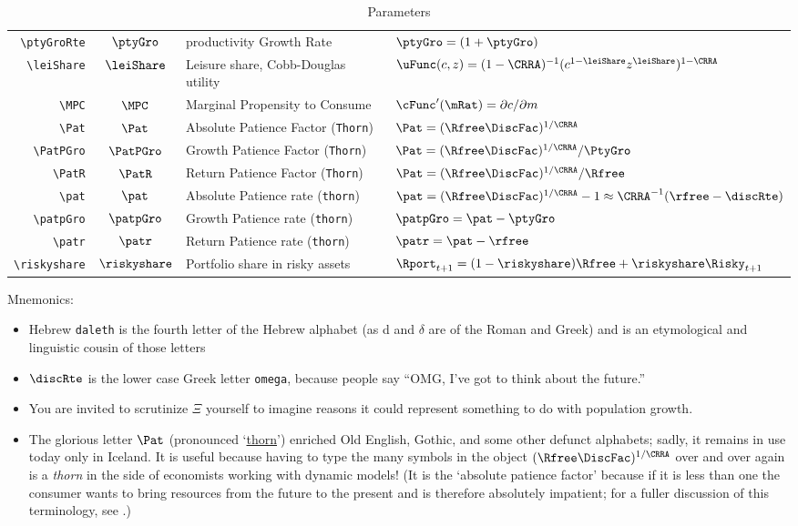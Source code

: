 \documentclass[12pt]{\econtex}
\begin{document}
\begin{table}[ht]
\begin{tabular}{|>{\ttfamily}rcll|}
    \\ \verb|\ptyGroRte|  & $\ptyGro$ & productivity Growth Rate & $\ptyGro = (1+\ptyGro)$
    \\ \verb|\leiShare|  & $\leiShare$ & Leisure share, Cobb-Douglas utility & $\uFunc(c,z)=(1-\CRRA)^{-1}(c^{1-\leiShare}z^{\leiShare})^{1-\CRRA}$
    \\ \verb|\MPC|  & $\MPC$ & Marginal Propensity to Consume & $\cFunc^{\prime}(\mRat)=\partial c/\partial m$
    \\ \verb|\Pat|  & $\Pat$ & Absolute Patience Factor (\texttt{Thorn}) & $\Pat = (\Rfree \DiscFac)^{1/\CRRA} $
    \\ \verb|\PatPGro| & $\PatPGro$ & Growth Patience Factor (\texttt{Thorn}) & $\Pat = (\Rfree \DiscFac)^{1/\CRRA}/\PtyGro $
    \\ \verb|\PatR| & $\PatR$ & Return Patience Factor (\texttt{Thorn}) & $\Pat = (\Rfree \DiscFac)^{1/\CRRA}/\Rfree $ 
    \\ \verb|\pat|  & $\pat$ & Absolute Patience rate (\texttt{thorn}) & $\pat = (\Rfree \DiscFac)^{1/\CRRA}-1 \approx \CRRA^{-1}(\rfree-\discRte) $
    \\ \verb|\patpGro| & $\patpGro$ & Growth Patience rate (\texttt{thorn}) & $\patpGro = \pat -\ptyGro $
    \\ \verb|\patr| & $\patr$ & Return Patience rate (\texttt{thorn}) & $\patr =\pat -\rfree $
    \\ \verb|\riskyshare|  & $\riskyshare$ & Portfolio share in risky assets & $\Rport_{t+1}=(1-\riskyshare)\Rfree+\riskyshare\Risky_{t+1}$
    \\	\hline
  \end{tabular}
  \caption{Parameters}
  \label{table:Parameters}
\end{table}	

Mnemonics:
\begin{itemize}
\item Hebrew \texttt{daleth} is the fourth letter of the Hebrew alphabet (as d and $\delta$ are of the Roman and Greek) and is an etymological and linguistic cousin of those letters
\item $\discRte$ is the lower case Greek letter \texttt{omega}, because people say ``OMG, I've got to think about the future.''
\item You are invited to scrutinize $\Xi$ yourself to imagine reasons it could represent something to do with population growth.  
\item The glorious letter $\Pat$ (pronounced `\href{http://en.wikipedia.org/wiki/Thorn_(letter)}{thorn}') enriched Old English, Gothic, and some other defunct alphabets; sadly, it remains in use today only in Iceland.  It is useful because having to type the many symbols in the object $(\Rfree \DiscFac)^{1/\CRRA}$ over and over again is a \textit{thorn} in the side of economists working with dynamic models!  (It is the `absolute patience factor' because if it is less than one the consumer wants to bring resources from the future to the present and is therefore absolutely impatient; for a fuller discussion of this terminology, see \cite{carrollTractable}.)
\end{itemize}
\end{document}
